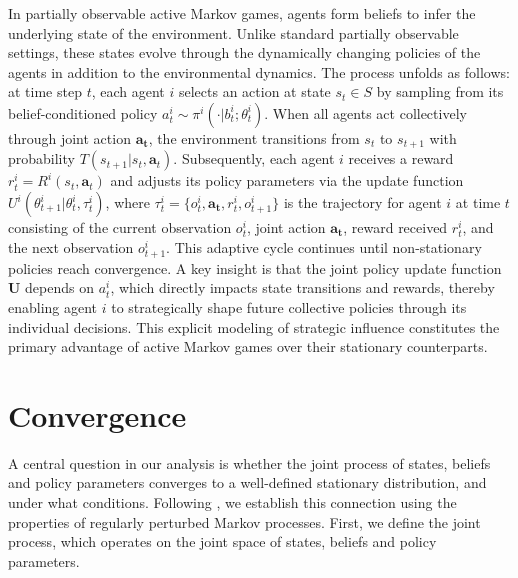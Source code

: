 \documentclass[a4paper,12pt]{report}
\begin{document}
In partially observable active Markov games, agents form beliefs to infer the underlying state of the environment. Unlike standard partially observable settings, these states evolve through the dynamically changing policies of the agents in addition to the environmental dynamics. The process unfolds as follows: at time step $t$, each agent $i$ selects an action at state $s_t \in S$ by sampling from its belief-conditioned policy $a^i_t \sim \pi^i(\cdot|b^i_t; \theta^i_t)$. When all agents act collectively through joint action $\boldsymbol{a_t}$, the environment transitions from $s_t$ to $s_{t+1}$ with probability $T(s_{t+1}|s_t, \boldsymbol{a}_t)$. Subsequently, each agent $i$ receives a reward $r^i_t = R^i(s_t, \boldsymbol{a}_t)$ and adjusts its policy parameters via the update function $U^i(\theta^i_{t+1}|\theta^i_t, \tau^i_t)$, where $\tau^i_t = \{o_t^i, \boldsymbol{a_t}, r^i_t, o_{t+1}^i\}$ is the trajectory for agent $i$ at time $t$ consisting of the current observation $o_t^i$, joint action $\boldsymbol{a_t}$, reward received $r^i_t$, and the next observation $o_{t+1}^i$. This adaptive cycle continues until non-stationary policies reach convergence. A key insight is that the joint policy update function $\boldsymbol{U}$ depends on $a^i_t$, which directly impacts state transitions and rewards, thereby enabling agent $i$ to strategically shape future collective policies through its individual decisions. This explicit modeling of strategic influence constitutes the primary advantage of active Markov games over their stationary counterparts.

\section{Convergence}
A central question in our analysis is whether the joint process of states, beliefs and policy parameters converges to a well-defined stationary distribution, and under what conditions. Following \citet{kim2022influencing}, we establish this connection using the properties of regularly perturbed Markov processes. First, we define the joint process, which operates on the joint space of states, beliefs and policy parameters.
\end{document}
